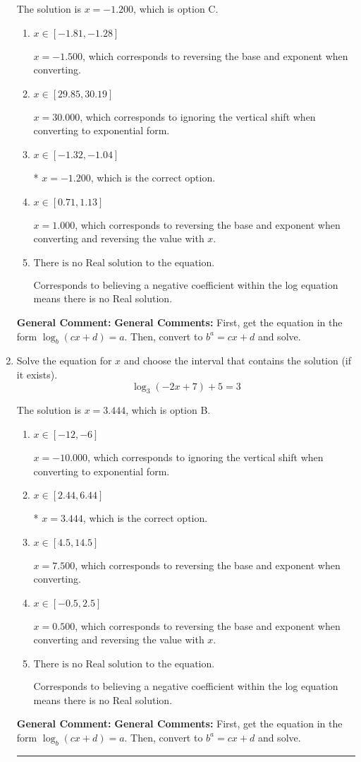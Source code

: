 \documentclass{extbook}[14pt]
\newcommand{\litem}[1]{\item #1

\rule{\textwidth}{0.4pt}}
\begin{document}
\begin{enumerate}
{The solution is \( x = -1.200 \), which is option C.\begin{enumerate}[label=\Alph*.]
\item \( x \in [-1.81, -1.28] \)

$x = -1.500$, which corresponds to reversing the base and exponent when converting.
\item \( x \in [29.85, 30.19] \)

$x = 30.000$, which corresponds to ignoring the vertical shift when converting to exponential form.
\item \( x \in [-1.32, -1.04] \)

* $x = -1.200$, which is the correct option.
\item \( x \in [0.71, 1.13] \)

$x = 1.000$, which corresponds to reversing the base and exponent when converting and reversing the value with $x$.
\item \( \text{There is no Real solution to the equation.} \)

Corresponds to believing a negative coefficient within the log equation means there is no Real solution.
\end{enumerate}

\textbf{General Comment:} \textbf{General Comments:} First, get the equation in the form $\log_b{(cx+d)} = a$. Then, convert to $b^a = cx+d$ and solve.
}
\litem{
Solve the equation for $x$ and choose the interval that contains the solution (if it exists).
\[ \log_{3}{(-2x+7)}+5 = 3 \]

The solution is \( x = 3.444 \), which is option B.\begin{enumerate}[label=\Alph*.]
\item \( x \in [-12, -6] \)

$x = -10.000$, which corresponds to ignoring the vertical shift when converting to exponential form.
\item \( x \in [2.44, 6.44] \)

* $x = 3.444$, which is the correct option.
\item \( x \in [4.5, 14.5] \)

$x = 7.500$, which corresponds to reversing the base and exponent when converting.
\item \( x \in [-0.5, 2.5] \)

$x = 0.500$, which corresponds to reversing the base and exponent when converting and reversing the value with $x$.
\item \( \text{There is no Real solution to the equation.} \)

Corresponds to believing a negative coefficient within the log equation means there is no Real solution.
\end{enumerate}

\textbf{General Comment:} \textbf{General Comments:} First, get the equation in the form $\log_b{(cx+d)} = a$. Then, convert to $b^a = cx+d$ and solve.
}
\end{enumerate}
\end{document}

